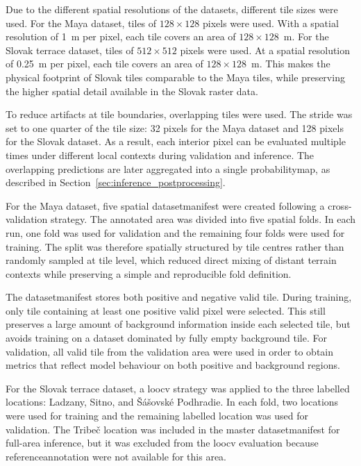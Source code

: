 Due to the different spatial resolutions of the datasets, different tile sizes were used. For the Maya dataset, tiles of $128 \times 128$ pixels were used. With a spatial resolution of 1~m per pixel, each tile covers an area of $128 \times 128$~m. For the Slovak terrace dataset, tiles of $512 \times 512$ pixels were used. At a spatial resolution of 0.25~m per pixel, each tile covers an area of $128 \times 128$~m. This makes the physical footprint of Slovak tiles comparable to the Maya tiles, while preserving the higher spatial detail available in the Slovak raster data.

To reduce artifacts at tile boundaries, overlapping tiles were used. The stride was set to one quarter of the tile size: 32 pixels for the Maya dataset and 128 pixels for the Slovak dataset. As a result, each interior pixel can be evaluated multiple times under different local contexts during validation and inference. The overlapping predictions are later aggregated into a single \gls{probabilitymap}, as described in Section~\ref{sec:inference_postprocessing}.

For the Maya dataset, five spatial \gls{datasetmanifest} were created following a cross-validation strategy. The annotated area was divided into five spatial folds. In each run, one fold was used for validation and the remaining four folds were used for training. The split was therefore spatially structured by tile centres rather than randomly sampled at tile level, which reduced direct mixing of distant terrain contexts while preserving a simple and reproducible fold definition.

The \gls{datasetmanifest} stores both positive and negative valid tile. During training, only tile containing at least one positive valid pixel were selected. This still preserves a large amount of background information inside each selected tile, but avoids training on a dataset dominated by fully empty background tile. For validation, all valid tile from the validation area were used in order to obtain metrics that reflect model behaviour on both positive and background regions.

For the Slovak terrace dataset, a \gls{loocv} strategy was applied to the three labelled locations: Ladzany, Sitno, and \v{S}\'{a}\v{s}ovsk\'{e} Podhradie. In each fold, two locations were used for training and the remaining labelled location was used for validation. The Tribe\v{c} location was included in the master \gls{datasetmanifest} for full-area inference, but it was excluded from the \gls{loocv} evaluation because \gls{referenceannotation} were not available for this area.

